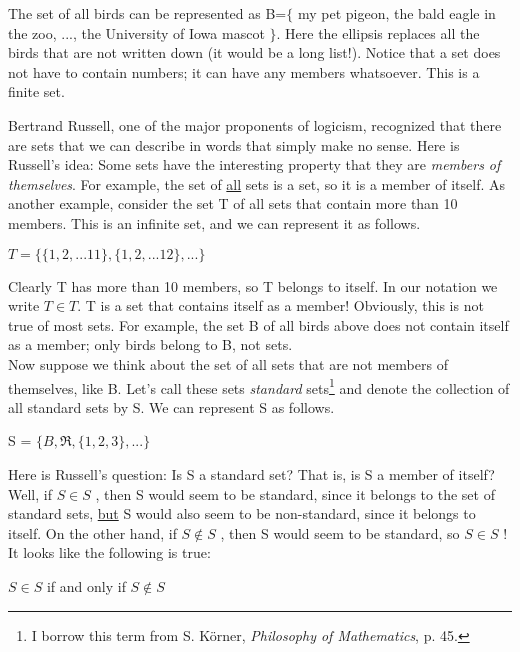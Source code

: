 \begin{exm}{2}
The set of all birds can be represented as B=$\lbrace$ my pet pigeon, the bald eagle in the zoo, ..., the University of Iowa mascot $\rbrace$.  Here the ellipsis replaces all the birds that are not written down (it would be a long list!).  Notice that a set does not have to contain numbers; it can have any members whatsoever.  This is a finite set.
\end{exm}

Bertrand Russell, one of the major proponents of logicism, recognized that there are sets that we can describe in words that simply make no sense.  Here is Russell's idea:  Some sets have the interesting property that they are \emph{members of themselves}.  For example, the set of \underline{all} sets is a set, so it is a member of itself.  As another example, consider the set T of all sets that contain more than 10 members.  This is an infinite set, and we can represent it as follows.
\begin{center}
$T=\lbrace\lbrace1,2,...11\rbrace,\lbrace1,2,...12\rbrace,...\rbrace$
\end{center}
 

Clearly T has more than 10 members, so T belongs to itself.  In our notation we write $T\in T$.  T is a set that contains itself as a member!  Obviously, this is not true of most sets.  For example, the set B of all birds above does not contain itself as a member; only birds belong to B, not sets.\\

     Now suppose we think about the set of all sets that are not members of themselves, like B.  Let's call these sets \emph{standard} sets\footnote{I borrow this term from S. Körner, \textit{Philosophy of Mathematics}, p. 45.} and denote the collection of all standard sets by S.  We can represent S as follows.
     \begin{center}
     S = $\{ B, \Re, \{1,2,3\},...\}$
     \end{center}

Here is Russell's question: Is S a standard set?  That is, is S a member of itself?  Well, if $S\in S$ , then S would seem to be standard, since it belongs to the set of standard sets, \underline{but} S would also seem to be non-standard, since it belongs to itself.  On the other hand, if $S\notin S$ , then S would seem to be standard, so $S\in S$  !  It looks like the following is true:

\begin{center}
$S\in S$ if and only if  $S\notin S$
\end{center}

